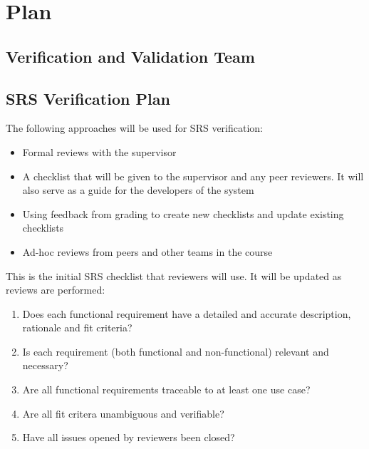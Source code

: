 \documentclass[12pt, titlepage]{article}
\begin{document}
\citet{SRS}


\section{Plan}


\subsection{Verification and Validation Team}


\subsection{SRS Verification Plan}
The following approaches will be used for SRS verification:
\begin{itemize}
  \item Formal reviews with the supervisor
  \item A checklist that will be given to the supervisor and any peer reviewers. It will also
  serve as a guide for the developers of the system
  \item Using feedback from grading to create new checklists and update existing checklists
  \item Ad-hoc reviews from peers and other teams in the course
\end{itemize}
This is the initial SRS checklist that reviewers will use. It will be updated as reviews are performed:
\begin{enumerate}[label=$\square$]
  \item Does each functional requirement have a detailed and accurate description, rationale and fit criteria?
  \item Is each requirement (both functional and non-functional) relevant and necessary?
  \item Are all functional requirements traceable to at least one use case?
  \item Are all fit critera unambiguous and verifiable?
  \item Have all issues opened by reviewers been closed? 
\end{enumerate}
\end{document}
